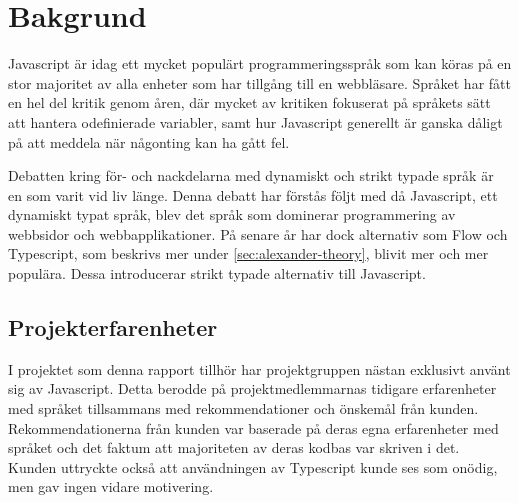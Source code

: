 \section{Bakgrund}
\label{sec:alexander-background}

Javascript är idag ett mycket populärt programmeringsspråk som kan köras på en stor majoritet av alla enheter som har tillgång till en webbläsare. Språket har fått en hel del kritik genom åren, där mycket av kritiken fokuserat på språkets sätt att hantera odefinierade variabler, samt hur Javascript generellt är ganska dåligt på att meddela när någonting kan ha gått fel.

Debatten kring för- och nackdelarna med dynamiskt och strikt typade språk är en som varit vid liv länge.\cite{old-type-debate} Denna debatt har förstås följt med då Javascript, ett dynamiskt typat språk, blev det språk som dominerar programmering av webbsidor och webbapplikationer. På senare år har dock alternativ som Flow och Typescript, som beskrivs mer under \ref{sec:alexander-theory}, blivit mer och mer populära. Dessa introducerar strikt typade alternativ till Javascript.

\subsection{Projekterfarenheter}
I projektet som denna rapport tillhör har projektgruppen nästan exklusivt använt sig av Javascript. Detta berodde på projektmedlemmarnas tidigare erfarenheter med språket tillsammans med rekommendationer och önskemål från kunden. Rekommendationerna från kunden var baserade på deras egna erfarenheter med språket och det faktum att majoriteten av deras kodbas var skriven i det. Kunden uttryckte också att användningen av Typescript kunde ses som onödig, men gav ingen vidare motivering.